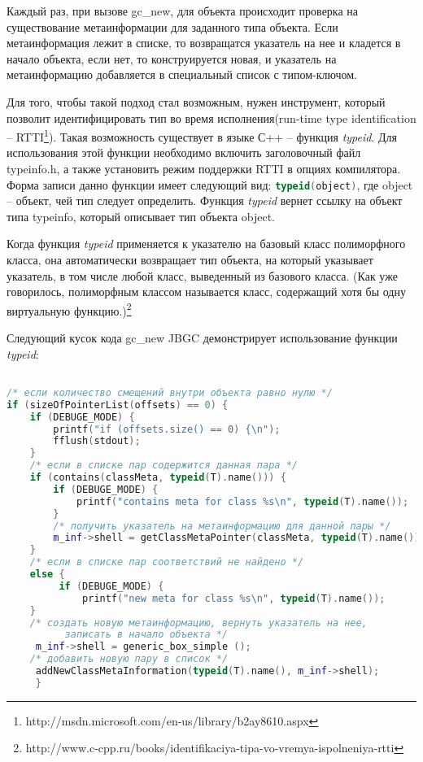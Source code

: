 Каждый раз, при вызове gc\_new, для объекта происходит проверка на существование метаинформации для заданного типа объекта. Если метаинформация лежит в списке, то возвращатся указатель на нее и кладется в начало объекта, если нет, то конструируется новая, и указатель на метаинформацию добавляется в  специальный список с типом-ключом.

Для того, чтобы такой подход стал возможным, нужен инструмент, который позволит идентифицировать тип во время исполнения(run-time type identification -- RTTI\footnote{ http://msdn.microsoft.com/en-us/library/b2ay8610.aspx}). Такая возможность существует в языке С++ -- функция \textit{typeid}. Для использования этой функции необходимо включить заголовочный файл typeinfo.h, а также установить режим поддержки RTTI в опциях компилятора. Форма записи данно функции имеет следующий вид:
\lstinline[language= C++]{typeid(object)}, где object -- объект, чей тип следует определить. Функция \textit{typeid} вернет ссылку на объект типа typeinfo, который описывает тип объекта object. 

Когда функция \textit{typeid} применяется к указателю на базовый класс полиморфного класса, она автоматически возвращает тип объекта, на который указывает указатель, в том числе любой класс, выведенный из базового класса. (Как уже говорилось, полиморфным классом называется класс, содержащий хотя бы одну виртуальную функцию.)\footnote{http://www.c-cpp.ru/books/identifikaciya-tipa-vo-vremya-ispolneniya-rtti}

Следующий кусок кода gc\_new JBGC демонстрирует использование функции \textit{typeid}:
\begin{lstlisting}[language= C++]

/* если количество смещений внутри объекта равно нулю */
if (sizeOfPointerList(offsets) == 0) { 
	if (DEBUGE_MODE) {
		printf("if (offsets.size() == 0) {\n");
		fflush(stdout);
	}
	/* если в списке пар содержится данная пара */
	if (contains(classMeta, typeid(T).name())) { 
		if (DEBUGE_MODE) {
			printf("contains meta for class %s\n", typeid(T).name());
		}
		/* получить указатель на метаинформацию для данной пары */
		m_inf->shell = getClassMetaPointer(classMeta, typeid(T).name());  
	}
	/* если в списке пар соответствий не найдено */ 
	else {
		 if (DEBUGE_MODE) {
			 printf("new meta for class %s\n", typeid(T).name());
 	}
	/* создать новую метаинформацию, вернуть указатель на нее,
	      записать в начало объекта */
	 m_inf->shell = generic_box_simple ();
	/* добавить новую пару в список */
	 addNewClassMetaInformation(typeid(T).name(), m_inf->shell); 
     }
\end{lstlisting}


